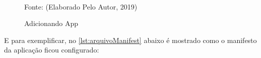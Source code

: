 \begin{figure}[!htpb]
	\centering
	\caption{Adicionando App}
	\\
	Fonte: (Elaborado Pelo Autor, 2019)
	\label{f_c4_pwa_custom}
\end{figure}

E para exemplificar, no \autoref{lst:arquivoManifest} abaixo é mostrado como o manifesto da aplicação ficou configurado:

